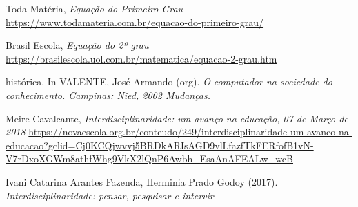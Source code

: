 \documentclass[12pt]{report}
\begin{document}
\begin{thebibliography}{9}

\noindent Toda Matéria, 
\textit{Equação do Primeiro Grau}
\url{https://www.todamateria.com.br/equacao-do-primeiro-grau/}

\noindent Brasil Escola, 
\textit{Equação do 2º grau}
\url{https://brasilescola.uol.com.br/matematica/equacao-2-grau.htm}

\noindent histórica. In VALENTE, José Armando (org). 
\textit{O computador na sociedade do conhecimento. Campinas: Nied, 2002 Mudanças.}

\noindent Meire Cavalcante,
\textit{Interdisciplinaridade: um avanço na educação, 07 de Março de 2018}
\url{https://novaescola.org.br/conteudo/249/interdisciplinaridade-um-avanco-na-educacao?gclid=Cj0KCQjwvvj5BRDkARIsAGD9vlLfazfTkFERfofB1vN-V7rDxoXGWm8athfWhg9VkX2lQnP6Awbh_EsaAnAFEALw_wcB}

\noindent Ivani Catarina Arantes Fazenda, Herminia Prado Godoy (2017).
\textit{Interdisciplinaridade: pensar, pesquisar e intervir}

\end{thebibliography}
\end{document}
